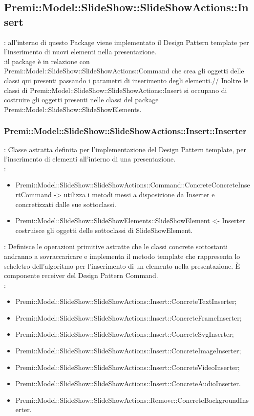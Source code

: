 	\subsection{Premi::Model::SlideShow::SlideShowActions::Insert}{
		\textbf{\tipo}: all’interno di questo Package viene implementato il Design Pattern template per l’inserimento di nuovi elementi nella presentazione.\\
		\textbf{\relaz}:il package è in relazione con Premi::Model::SlideShow::SlideShowActions::Command che crea gli oggetti delle classi qui presenti passando i parametri di inserimento degli elementi.//
        Inoltre le classi di Premi::Model::SlideShow::SlideShowActions::Insert si occupano di costruire gli oggetti presenti nelle classi del package Premi::Model::SlideShow::SlideShowElements.
	
	\subsubsection{Premi::Model::SlideShow::SlideShowActions::Insert::Inserter}{
		\textbf{\tipo}: Classe astratta definita per l’implementazione del Design Pattern template, per l’inserimento di elementi all’interno di una presentazione.\\	
		\textbf{\relaz}:
		\begin{itemize}
			\item Premi::Model::SlideShow::SlideShowActions::Command::ConcreteConcreteInsertCommand -> utilizza i metodi messi a disposizione da Inserter e concretizzati dalle sue sottoclassi.
            \item Premi::Model::SlideShow::SlideShowElements::SlideShowElement <- Inserter costruisce gli oggetti delle sottoclassi di SlideShowElement.
		\end{itemize} 
		\textbf{\interfacce}: Definisce le operazioni primitive astratte che le classi concrete sottostanti andranno a sovraccaricare e implementa il metodo template che rappresenta lo scheletro dell'algoritmo per l’inserimento di un elemento nella presentazione.
È componente receiver del Design Pattern Command.\\
        \textbf{\figli}: 
        \begin{itemize}
            \item Premi::Model::SlideShow::SlideShowActions::Insert::ConcreteTextInserter;
            \item Premi::Model::SlideShow::SlideShowActions::Insert::ConcreteFrameInserter;
            \item Premi::Model::SlideShow::SlideShowActions::Insert::ConcreteSvgInserter;
            \item Premi::Model::SlideShow::SlideShowActions::Insert::ConcreteImageInserter;
            \item Premi::Model::SlideShow::SlideShowActions::Insert::ConcreteVideoInserter;
            \item Premi::Model::SlideShow::SlideShowActions::Insert::ConcreteAudioInserter.
            \item Premi::Model::SlideShow::SlideShowActions::Remove::ConcreteBackgroundInserter.
        \end{itemize}
	}
}
